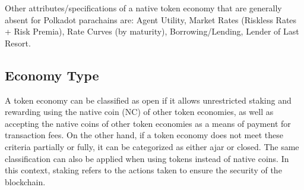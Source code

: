 \documentclass[11pt]{article}
\begin{document}
Other attributes/specifications of a native token economy that are generally absent for Polkadot parachains are: Agent Utility, Market Rates (Riskless Rates + Risk Premia), Rate Curves (by maturity), Borrowing/Lending, Lender of Last Resort.

\subsection{Economy Type}
A token economy can be classified as open if it allows unrestricted staking and rewarding using the native coin (NC) of other token economies, as well as accepting the native coins of other token economies as a means of payment for transaction fees. On the other hand, if a token economy does not meet these criteria partially or fully, it can be categorized as either ajar or closed. The same classification can also be applied when using tokens instead of native coins. In this context, staking refers to the actions taken to ensure the security of the blockchain.
\end{document}
